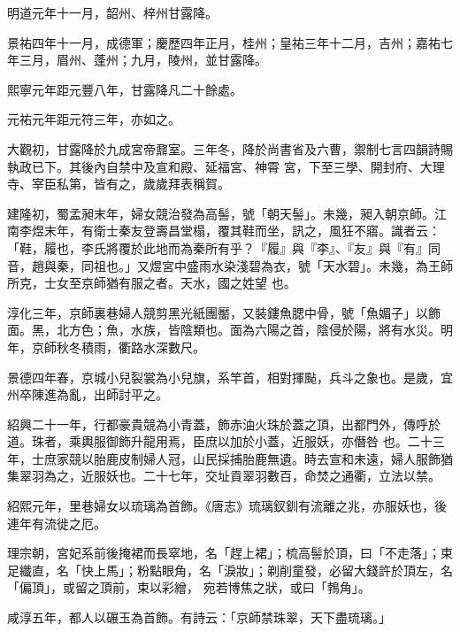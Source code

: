 \begin{pinyinscope}
 明道元年十一月，韶州、梓州甘露降。



 景祐四年十一月，成德軍；慶歷四年正月，桂州；皇祐三年十二月，吉州；嘉祐七年三月，眉州、蓬州；九月，陵州，並甘露降。



 熙寧元年距元豐八年，甘露降凡二十餘處。



 元祐元年距元符三年，亦如之。



 大觀初，甘露降於九成宮帝鼐室。三年冬，降於尚書省及六曹，禦制七言四韻詩賜執政已下。其後內自禁中及宣和殿、延福宮、神霄
 宮，下至三學、開封府、大理寺、宰臣私第，皆有之，歲歲拜表稱賀。



 建隆初，蜀孟昶末年，婦女競治發為高髻，號「朝天髻」。未幾，昶入朝京師。江南李煜末年，有衛士秦友登壽昌堂榻，覆其鞋而坐，訊之，風狂不寤。識者云：「鞋，履也，李氏將覆於此地而為秦所有乎？『履』與『李』、『友』與『有』同音，趙與秦，同祖也。」又煜宮中盛雨水染淺碧為衣，號「天水碧」。未幾，為王師所克，士女至京師猶有服之者。天水，國之姓望
 也。



 淳化三年，京師裏巷婦人競剪黑光紙團靨，又裝鏤魚腮中骨，號「魚媚子」以飾面。黑，北方色；魚，水族，皆陰類也。面為六陽之首，陰侵於陽，將有水災。明年，京師秋冬積雨，衢路水深數尺。



 景德四年春，京城小兒裂裳為小兒旗，系竿首，相對揮颭，兵斗之象也。是歲，宜州卒陳進為亂，出師討平之。



 紹興二十一年，行都豪貴競為小青蓋，飾赤油火珠於蓋之頂，出都門外，傳呼於道。珠者，乘輿服御飾升龍用焉，臣庶以加於小蓋，近服妖，亦僭咎
 也。二十三年，士庶家競以胎鹿皮制婦人冠，山民採捕胎鹿無遺。時去宣和未遠，婦人服飾猶集翠羽為之，近服妖也。二十七年，交址貢翠羽數百，命焚之通衢，立法以禁。



 紹熙元年，里巷婦女以琉璃為首飾。《唐志》琉璃釵釧有流離之兆，亦服妖也，後連年有流徙之厄。



 理宗朝，宮妃系前後掩裙而長窣地，名「趕上裙」；梳高髻於頂，曰「不走落」；束足纖直，名「快上馬」；粉點眼角，名「淚妝」；剃削童發，必留大錢許於頂左，名「偏頂」，或留之頂前，束以彩繒，
 宛若博焦之狀，或曰「鵓角」。



 咸淳五年，都人以碾玉為首飾。有詩云：「京師禁珠翠，天下盡琉璃。」




\end{pinyinscope}

